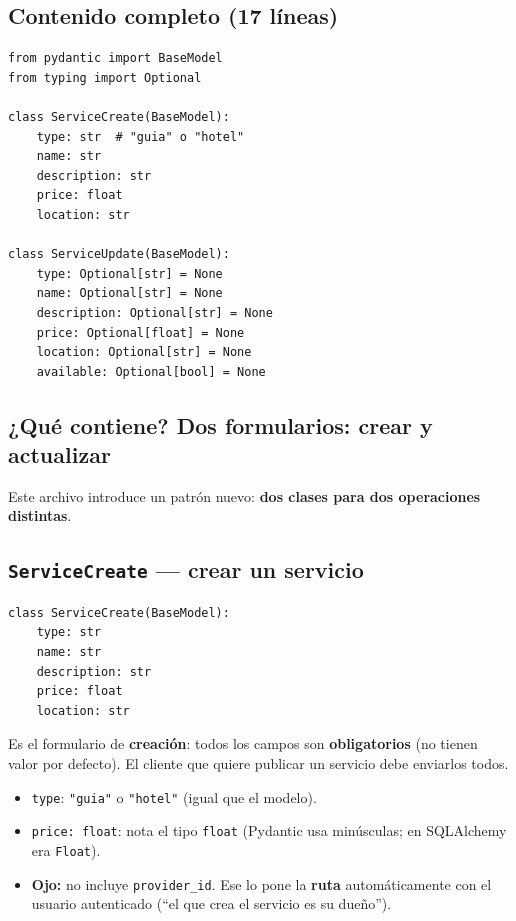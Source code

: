 \documentclass[11pt,a4paper]{article}
\begin{document}
\subsection{Contenido completo (17 líneas)}

\begin{lstlisting}
from pydantic import BaseModel
from typing import Optional

class ServiceCreate(BaseModel):
    type: str  # "guia" o "hotel"
    name: str
    description: str
    price: float
    location: str

class ServiceUpdate(BaseModel):
    type: Optional[str] = None
    name: Optional[str] = None
    description: Optional[str] = None
    price: Optional[float] = None
    location: Optional[str] = None
    available: Optional[bool] = None
\end{lstlisting}

\subsection{¿Qué contiene? \textbf{Dos} formularios: crear y actualizar}

Este archivo introduce un patrón nuevo: \textbf{dos clases para dos operaciones distintas}.

\subsection{\texttt{ServiceCreate} --- crear un servicio}

\begin{lstlisting}
class ServiceCreate(BaseModel):
    type: str
    name: str
    description: str
    price: float
    location: str
\end{lstlisting}

Es el formulario de \textbf{creación}: todos los campos son \textbf{obligatorios} (no tienen
valor por defecto). El cliente que quiere publicar un servicio debe enviarlos todos.

\begin{itemize}
    \item \texttt{type}: \texttt{"guia"} o \texttt{"hotel"} (igual que el modelo).
    \item \texttt{price: float}: nota el tipo \texttt{float} (Pydantic usa minúsculas;
    en SQLAlchemy era \texttt{Float}).
    \item \textbf{Ojo:} no incluye \texttt{provider\_id}. Ese lo pone la \textbf{ruta}
    automáticamente con el usuario autenticado (``el que crea el servicio es su dueño'').
\end{itemize}
\end{document}
